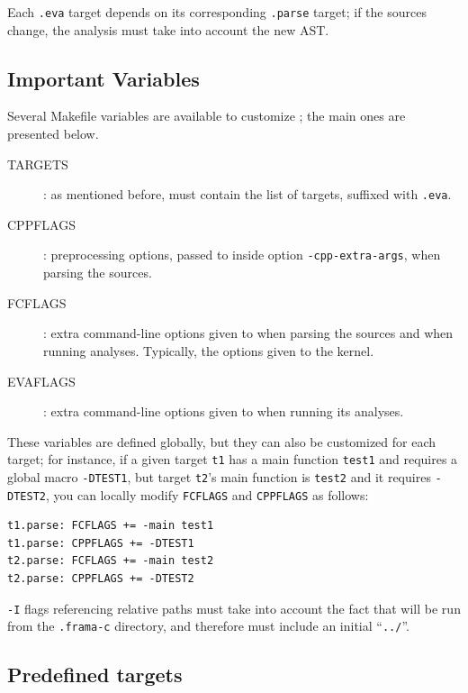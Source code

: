 Each \texttt{.eva} target depends on its corresponding \texttt{.parse} target;
if the sources change, the analysis must take into account the new AST.

\subsection{Important Variables}

Several Makefile variables are available to customize \FramaC; the main
ones are presented below.

\begin{description}
\item[TARGETS]: as mentioned before, must contain the list of targets,
  suffixed with \texttt{.eva}.
\item[CPPFLAGS]: preprocessing options, passed to \FramaC inside option
  \texttt{-cpp-extra-args}, when parsing the sources.
\item[FCFLAGS]: extra command-line options given to \FramaC when parsing the
  sources and when running analyses. Typically, the options given to the
  \FramaC kernel.
\item[EVAFLAGS]: extra command-line options given to \Value when running
  its analyses.
\end{description}

These variables are defined globally, but they can also be customized for
each target; for instance, if a given target \texttt{t1} has a main
function \texttt{test1} and requires a global macro \texttt{-DTEST1}, but
target \texttt{t2}'s main function is \texttt{test2} and it requires
\texttt{-DTEST2}, you can locally modify \texttt{FCFLAGS} and \texttt{CPPFLAGS}
as follows:

\begin{lstlisting}
t1.parse: FCFLAGS += -main test1
t1.parse: CPPFLAGS += -DTEST1
t2.parse: FCFLAGS += -main test2
t2.parse: CPPFLAGS += -DTEST2
\end{lstlisting}

\begin{important}
\texttt{-I} flags referencing relative paths must take into account the
fact that \FramaC will be run from the \texttt{.frama-c} directory, and
therefore must include an initial ``\texttt{../}''.
\end{important}

\subsection{Predefined targets}

